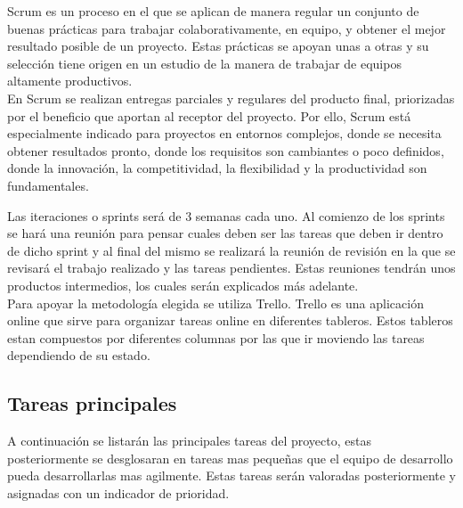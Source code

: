 Scrum es un proceso en el que se aplican de manera regular un conjunto de buenas prácticas para trabajar colaborativamente, en equipo, y obtener el mejor resultado posible de un proyecto. Estas prácticas se apoyan unas a otras y su selección tiene origen en un estudio de la manera de trabajar de equipos altamente productivos.\\

En Scrum se realizan entregas parciales y regulares del producto final, priorizadas por el beneficio que aportan al receptor del proyecto. Por ello, Scrum está especialmente indicado para proyectos en entornos complejos, donde se necesita obtener resultados pronto, donde los requisitos son cambiantes o poco definidos, donde la innovación, la competitividad, la flexibilidad y la productividad son fundamentales.\\


Las iteraciones o sprints será de 3 semanas cada uno. Al comienzo de los sprints se hará una reunión para pensar cuales deben ser las tareas que deben ir dentro de dicho sprint y al final del mismo se realizará la reunión de revisión en la que se revisará el trabajo realizado y las tareas pendientes. Estas reuniones tendrán unos productos intermedios, los cuales serán explicados más adelante.\\

Para apoyar la metodología elegida se utiliza Trello. Trello es una aplicación online que sirve para organizar tareas online en diferentes tableros. Estos tableros estan compuestos por diferentes columnas por las que ir moviendo las tareas dependiendo de su estado.

\subsection{Tareas principales}
A continuación se listarán las principales tareas del proyecto, estas posteriormente se desglosaran en tareas mas pequeñas que el equipo de desarrollo pueda desarrollarlas mas agilmente. Estas tareas serán valoradas posteriormente y asignadas con un indicador de prioridad.

